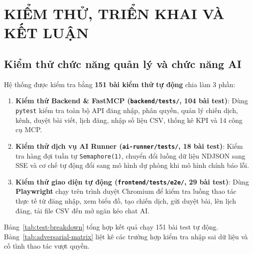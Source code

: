 \chapter{KIỂM THỬ, TRIỂN KHAI VÀ KẾT LUẬN}

\section{Kiểm thử chức năng quản lý và chức năng AI}

Hệ thống được kiểm tra bằng \textbf{151 bài kiểm thử tự động} chia làm 3 phần:
\begin{enumerate}[noitemsep,topsep=2pt]
 \item \textbf{Kiểm thử Backend \& FastMCP (\texttt{backend/tests/}, 104 bài test)}: Dùng \texttt{pytest} kiểm tra toàn bộ API đăng nhập, phân quyền, quản lý chiến dịch, kênh, duyệt bài viết, lịch đăng, nhập số liệu CSV, thống kê KPI và 14 công cụ MCP.
 \item \textbf{Kiểm thử dịch vụ AI Runner (\texttt{ai-runner/tests/}, 18 bài test)}: Kiểm tra hàng đợi tuần tự \texttt{Semaphore(1)}, chuyển đổi luồng dữ liệu NDJSON sang SSE và cơ chế tự động đổi sang mô hình dự phòng khi mô hình chính báo lỗi.
 \item \textbf{Kiểm thử giao diện tự động (\texttt{frontend/tests/e2e/}, 29 bài test)}: Dùng \textbf{Playwright} chạy trên trình duyệt Chromium để kiểm tra luồng thao tác thực tế từ đăng nhập, xem biểu đồ, tạo chiến dịch, gửi duyệt bài, lên lịch đăng, tải file CSV đến mở ngăn kéo chat AI.
\end{enumerate}

Bảng~\ref{tab:test-breakdown} tổng hợp kết quả chạy 151 bài test tự động. Bảng~\ref{tab:adversarial-matrix} liệt kê các trường hợp kiểm tra nhập sai dữ liệu và cố tình thao tác vượt quyền.

